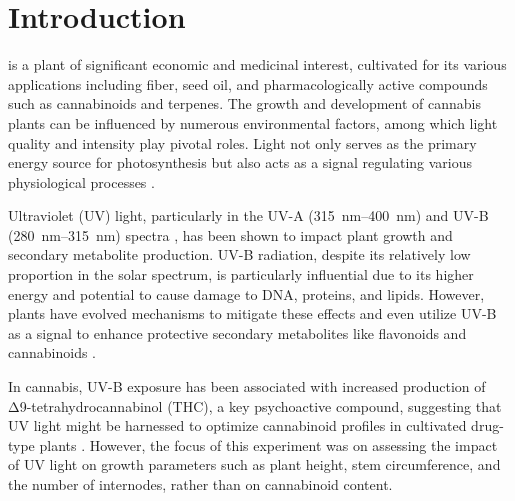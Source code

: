 \section{Introduction}

 is a plant of significant economic and medicinal interest, cultivated for its various applications including fiber, seed oil, and pharmacologically active compounds such as cannabinoids and terpenes. The growth and development of cannabis plants can be influenced by numerous environmental factors, among which light quality and intensity play pivotal roles. Light not only serves as the primary energy source for photosynthesis but also acts as a signal regulating various physiological processes \autocite{eichhorn_bilodeau_update_2019}.

Ultraviolet (UV) light, particularly in the UV-A (\qtyrange[mode=text, range-phrase=\textendash, range-units=single]{315}{400}{\nm}) and UV-B (\qtyrange[mode=text, range-phrase=\textendash, range-units=single]{280}{315}{\nm}) spectra \autocite{international_organization_for_standardization_space_2007}, has been shown to impact plant growth and secondary metabolite production. UV-B radiation, despite its relatively low proportion in the solar spectrum, is particularly influential due to its higher energy and potential to cause damage to DNA, proteins, and lipids. However, plants have evolved mechanisms to mitigate these effects and even utilize UV-B as a signal to enhance protective secondary metabolites like flavonoids and cannabinoids \autocite{eichhorn_bilodeau_update_2019}.

In cannabis, UV-B exposure has been associated with increased production of Δ9-tetrahydrocannabinol (THC), a key psychoactive compound, suggesting that UV light might be harnessed to optimize cannabinoid profiles in cultivated drug-type plants \autocite{eichhorn_bilodeau_update_2019, lydon_uv-b_1987}. However, the focus of this experiment was on assessing the impact of UV light on growth parameters such as plant height, stem circumference, and the number of internodes, rather than on cannabinoid content.

